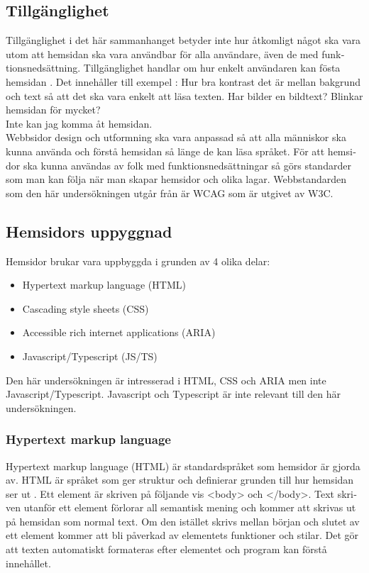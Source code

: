 \documentclass[11p]{article}
\begin{document}
\begin{otherlanguage}{swedish}
    \subsection{Tillgänglighet}
    Tillgänglighet i det här sammanhanget betyder inte hur åtkomligt något ska vara utom att hemsidan ska vara användbar för alla användare, även de med funktionsnedsättning.
    Tillgänglighet handlar om hur enkelt användaren kan fösta hemsidan \parencite{webbriktlinjer}.
    Det innehåller till exempel :
    Hur bra kontrast det är mellan bakgrund och text så att det ska vara enkelt att läsa texten.
    Har bilder en bildtext?
    Blinkar hemsidan för mycket?
    \\Inte kan jag komma åt hemsidan.
    \\Webbsidor design och utformning ska vara anpassad så att alla människor ska kunna använda och förstå hemsidan så länge de kan läsa språket.
    För att hemsidor ska kunna användas av folk med funktionsnedsättningar så görs standarder som man kan följa när man skapar hemsidor och olika lagar.
    Webbstandarden som den här undersökningen utgår från är WCAG som är utgivet av W3C.


    \subsection{Hemsidors uppyggnad}
    Hemsidor brukar vara uppbyggda i grunden av 4 olika delar:
    \begin{itemize}
        \item Hypertext markup language (HTML)
        \item Cascading style sheets (CSS)
        \item Accessible rich internet applications (ARIA)
        \item Javascript/Typescript (JS/TS)
    \end{itemize}
    Den här undersökningen är intresserad i HTML, CSS och ARIA men inte Javascript/Typescript.
    Javascript och Typescript är inte relevant till den här undersökningen.

    \subsubsection{Hypertext markup language}
    Hypertext markup language (HTML) är standardspråket som hemsidor är gjorda av.
    HTML är språket som ger struktur och definierar grunden till hur hemsidan ser ut \parencite{HTML}.
    Ett element är skriven på följande vis <body> och </body>.
    Text skriven utanför ett element förlorar all semantisk mening och kommer att skrivas ut på hemsidan som normal text.
    Om den istället skrivs mellan början och slutet av ett element kommer att bli påverkad av elementets funktioner och stilar.
    Det gör att texten automatiskt formateras efter elementet och program kan förstå innehållet.


\end{otherlanguage}
\end{document}
